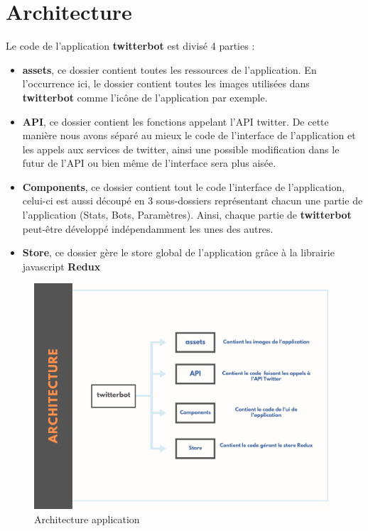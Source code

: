 \documentclass{article}
\begin{document}
\section{Architecture}
Le code de l'application \textbf{twitterbot} est divisé 4 parties :
\begin{itemize}
\item 	\textbf{assets}, ce dossier contient toutes les ressources de l'application. En l'occurrence ici, le dossier contient toutes les images utilisées dans \textbf{twitterbot} comme l'icône de l'application par exemple.
\item 	\textbf{API}, ce dossier contient les fonctions appelant l'API twitter. De cette manière nous avons séparé au mieux le code de l'interface de l'application et les appels aux services de twitter, ainsi une possible modification dans le futur de l'API ou bien même de l'interface sera plus aisée.
\item 	\textbf{Components}, ce dossier contient tout le code l'interface de l'application, celui-ci est aussi découpé en 3 sous-dossiers représentant chacun une partie de l'application (Stats, Bots, Paramètres). Ainsi, chaque partie de \textbf{twitterbot} peut-être développé indépendamment les unes des autres.
\item 	\textbf{Store}, ce dossier gère le store global de l'application grâce à la librairie javascript \textbf{Redux}
\end{itemize}



\begin{figure}[h!]
\centering
\includegraphics[scale=0.5]{images/architecture.png}
\caption{Architecture application}
\label{fig:Architecture application}
\end{figure}
\end{document}
